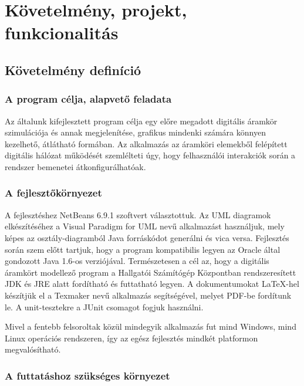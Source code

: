%
\chapter{Követelmény, projekt, funkcionalitás}

\thispagestyle{fancy}


\section{Követelmény definíció}
\label{sec:reqdef}

\subsection{A program célja, alapvető feladata}

Az általunk kifejlesztett program célja egy előre megadott digitális áramkör szimulációja és annak megjelenítése, grafikus mindenki számára könnyen kezelhető, átlátható formában. Az alkalmazás az áramköri elemekből felépített digitális hálózat működését szemlélteti úgy, hogy felhasználói interakciók során a rendszer bemenetei átkonfigurálhatóak.

\subsection{A fejlesztőkörnyezet}
\label{sec:devenvironment}

A fejlesztéshez NetBeans 6.9.1 szoftvert választottuk. Az UML diagramok elkészítéséhez a Visual Paradigm for UML nevű alkalmazást használjuk, mely képes az osztály-diagramból Java forráskódot generálni és vica versa. Fejlesztés során szem előtt tartjuk, hogy a program kompatibilis legyen az Oracle által gondozott Java 1.6-os verziójával. Természetesen a cél az, hogy a digitális áramkört modellező program a Hallgatói Számítógép Központban rendszeresített JDK és JRE alatt fordítható és futtatható legyen. A dokumentumokat \LaTeX{}-hel készítjük el a Texmaker nevű alkalmazás segítségével, melyet PDF-be fordítunk le. A unit-tesztekre a JUnit csomagot fogjuk használni.

Mivel a fentebb felsoroltak közül mindegyik alkalmazás fut mind Windows, mind Linux operációs rendszeren, így az egész fejlesztés mindkét platformon megvalósítható.

\subsection{A futtatáshoz szükséges környezet}

